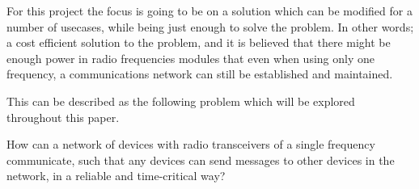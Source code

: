 For this project the focus is going to be on a solution which can be modified for a number of usecases, while being just enough to solve the problem.
In other words; a cost efficient solution to the problem, and it is believed that there might be enough power in radio frequencies modules that even when using only one frequency, a communications network can still be established and maintained.

This can be described as the following problem which will be explored throughout this paper.
\bigskip

{\addtolength{\leftskip}{10mm}\addtolength{\rightskip}{10mm}\noindent\hrulefill\it

\noindent How can a network of devices with radio transceivers of a single frequency communicate, such that any devices can send messages to other devices in the network, in a reliable and time-critical way?

\noindent\hrulefill

}